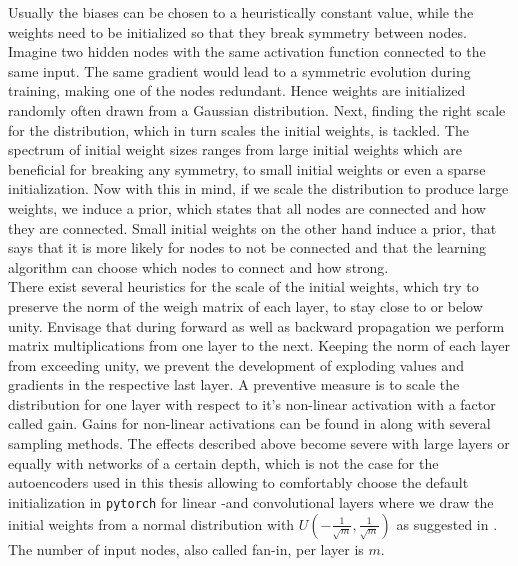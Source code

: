 Usually the biases can be chosen to a heuristically constant value, while the weights need to be initialized so that they break symmetry between nodes. Imagine two hidden nodes with the same activation function connected to the same input. The same gradient would lead to a symmetric evolution during training, making one of the nodes redundant. Hence weights are initialized randomly often drawn from a Gaussian distribution. Next, finding the right scale for the distribution, which in turn scales the initial weights, is tackled. The spectrum of initial weight sizes ranges from large initial weights which are beneficial for breaking any symmetry, to small initial weights or even a sparse initialization. Now with this in mind, if we scale the distribution to produce large weights, we induce a prior, which states that all nodes are connected and how they are connected. Small initial weights on the other hand induce a prior, that says that it is more likely for nodes to not be connected and that the learning algorithm can choose which nodes to connect and how strong.\\
There exist several heuristics for the scale of the initial weights, which try to preserve the norm of the weigh matrix of each layer, to stay close to or below unity. Envisage that during forward as well as backward propagation we perform matrix multiplications from one layer to the next. Keeping the norm of each layer from exceeding unity, we prevent the development of exploding values and gradients in the respective last layer. A preventive measure is to scale the distribution for one layer with respect to it's non-linear activation with a factor called gain. Gains for non-linear activations can be found in \cite{torch_ini} along with several sampling methods. The effects described above become severe with large layers or equally with networks of a certain depth, which is not the case for the autoencoders used in this thesis allowing to comfortably choose the default initialization in \texttt{pytorch} for linear -and convolutional layers where we draw the initial weights from a normal distribution with \(U(-\frac{1}{\sqrt{m}},\frac{1}{\sqrt{m}})\) as suggested in \cite{LeCun98}. The number of input nodes, also called fan-in, per layer is \(m\).\\

